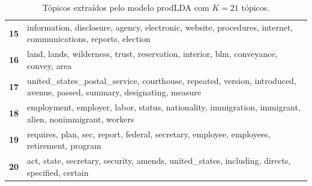 \begin{table}[htpb]
\begin{tabularx}{\textwidth}{@{}l X@{}}
        \textbf{15} & information, disclosure, agency, electronic, website, procedures, internet, communications, reports, election \\
        \textbf{16} & land, lands, wilderness, trust, reservation, interior, blm, conveyance, convey, area \\
        \textbf{17} & united\_states\_postal\_service, courthouse, repeated, version, introduced, avenue, passed, summary, designating, measure \\
        \textbf{18} & employment, employer, labor, status, nationality, immigration, immigrant, alien, nonimmigrant, workers \\
        \textbf{19} & requires, plan, sec, report, federal, secretary, employee, employees, retirement, program \\
        \textbf{20} & act, state, secretary, security, amends, united\_states, including, directs, specified, certain \\
        \bottomrule
    \end{tabularx}
    \caption{Tópicos extraídos pelo modelo prodLDA com $K=21$ tópicos.}
    \label{tab:topicos_prodlda_21}
\end{table}
